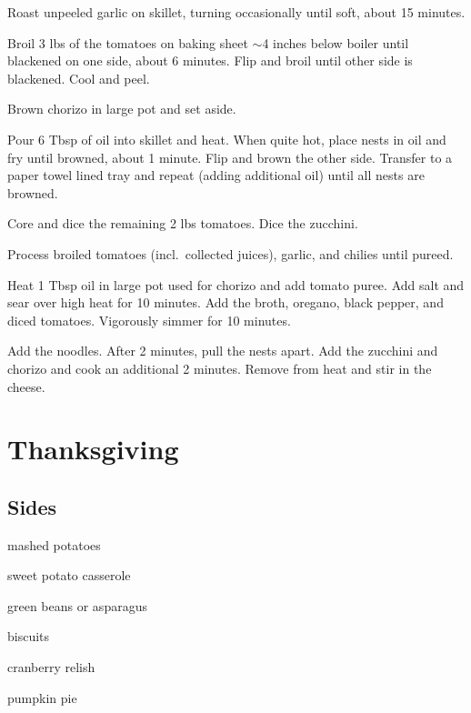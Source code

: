 \documentclass[oneside]{book}  %
\def\thisrecipe{}  %
\newcommand{\recipe}[1]{\section{#1}\def\thisrecipe{: #1}} %
\newcommand{\about}{$\sim$}
\begin{document}
\begin{directions}
  \item Roast unpeeled garlic on skillet, turning occasionally until soft, about
    15 minutes.

  \item Broil 3 lbs of the tomatoes on baking sheet \about 4 inches below boiler
    until blackened on one side, about 6 minutes. Flip and broil until other
    side is blackened. Cool and peel.

  \item Brown chorizo in large pot and set aside.

  \item Pour 6 Tbsp of oil into skillet and heat. When quite hot, place nests in
    oil and fry until browned, about 1 minute. Flip and brown the other side.
    Transfer to a paper towel lined tray and repeat (adding additional oil)
    until all nests are browned.

  \item Core and dice the remaining 2 lbs tomatoes. Dice the zucchini.

  \item Process broiled tomatoes (incl.\ collected juices), garlic, and chilies
    until pureed.

  \item Heat 1 Tbsp oil in large pot used for chorizo and add tomato puree. Add
    salt and sear over high heat for 10 minutes. Add the broth, oregano, black
    pepper, and diced tomatoes. Vigorously simmer for 10 minutes.

  \item Add the noodles. After 2 minutes, pull the nests apart. Add the zucchini
    and chorizo and cook an additional 2 minutes. Remove from heat and stir in
    the cheese.
\end{directions}
\recipe{Thanksgiving} \label{recipe:thanksgiving} %

\subsection{Sides}
\begin{twocols} \begin{ingredientslist}
  \item mashed potatoes
  \item sweet potato casserole
  \item green beans or asparagus
  \item biscuits
  \item cranberry relish
  \item pumpkin pie
\end{ingredientslist} \end{twocols}
\end{document}
